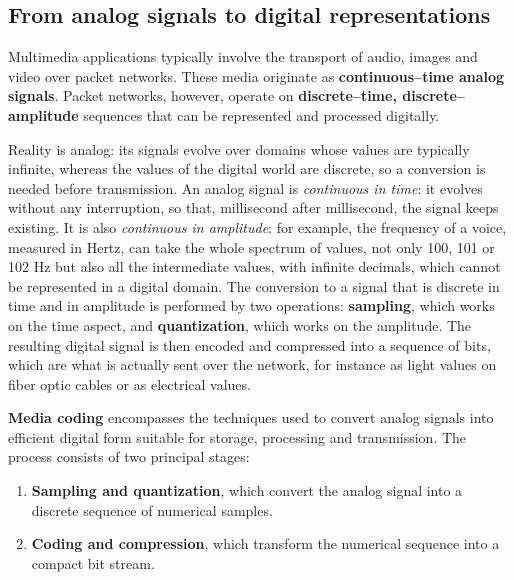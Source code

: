 \subsection{From analog signals to digital representations}

Multimedia applications typically involve the transport of audio, images and video over packet networks. These media originate as \textbf{continuous--time analog signals}. Packet networks, however, operate on \textbf{discrete--time, discrete--amplitude} sequences that can be represented and processed digitally.


\begin{center}
\end{center}


Reality is analog: its signals evolve over domains whose values are typically infinite, whereas the values of the digital world are discrete, so a conversion is needed before transmission. An analog signal is \emph{continuous in time}: it evolves without any interruption, so that, millisecond after millisecond, the signal keeps existing. It is also \emph{continuous in amplitude}: for example, the frequency of a voice, measured in Hertz, can take the whole spectrum of values, not only 100, 101 or 102 Hz but also all the intermediate values, with infinite decimals, which cannot be represented in a digital domain. The conversion to a signal that is discrete in time and in amplitude is performed by two operations: \textbf{sampling}, which works on the time aspect, and \textbf{quantization}, which works on the amplitude. The resulting digital signal is then encoded and compressed into a sequence of bits, which are what is actually sent over the network, for instance as light values on fiber optic cables or as electrical values.

\textbf{Media coding} encompasses the techniques used to convert analog signals into efficient digital form suitable for storage, processing and transmission. The process consists of two principal stages:

\begin{enumerate}
\item \textbf{Sampling and quantization}, which convert the analog signal into a discrete sequence of numerical samples.
\item \textbf{Coding and compression}, which transform the numerical sequence into a compact bit stream.
\end{enumerate}


